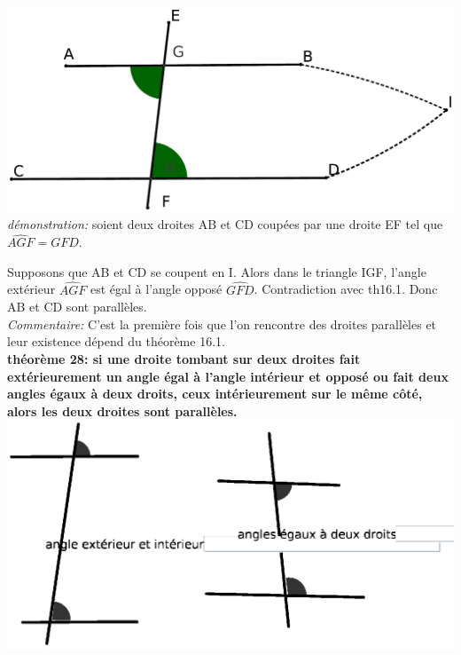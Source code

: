 \documentclass[a4paper, 12pt, twoside]{book}
\begin{document}
  
  \includegraphics[scale=0.2]{figures/th27.eps} \\
  
  \textit{démonstration:} soient deux droites AB et CD coupées par une droite EF tel que  $\hat{AGF}=\hat{GFD}$.\
  
  Supposons que AB et CD se coupent en I. Alors dans le triangle IGF, l'angle extérieur $\hat{AGF}$  est égal à l'angle opposé $\hat{GFD}$. Contradiction avec th16.1. Donc AB et CD sont parallèles.\\
  
  \textit{Commentaire:} C'est la première fois que l'on rencontre des droites parallèles et leur existence dépend du théorème 16.1.\\
  
  
  
   
  
  
    
  
  
 
  \newpage \textbf{théorème 28: si une droite tombant sur deux droites fait extérieurement un angle égal à l'angle intérieur et opposé ou fait deux angles égaux à deux droits, ceux intérieurement sur le même côté, alors les deux droites sont parallèles.}\\
  
  
 
 \includegraphics[scale=0.7]{figures/LIVRE1&28.eps} \\
 
\end{document}
